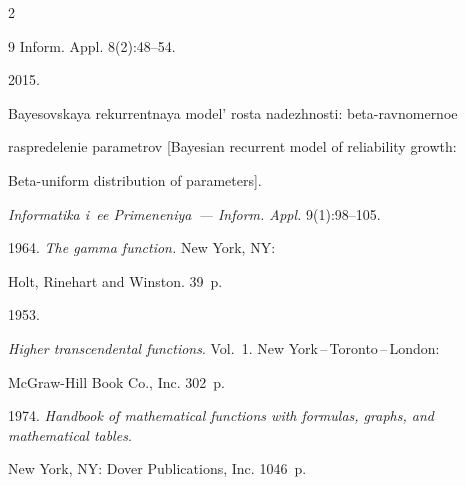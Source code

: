 \begin{multicols}{2}
{{\begin{thebibliography}{9}
{Inform. Appl.} 8(2):48--54.







 2015.


Bayesovskaya rekurrentnaya mo\-del' ros\-ta na\-dezh\-nosti: beta-ravnomernoe


raspredelenie pa\-ra\-met\-rov [Bayesian recurrent model of reliability growth: 


Beta-uniform distribution of parameters].


\textit{Informatika i~ee Primeneniya~--- Inform. Appl.} 9(1):98--105.







 1964. \textit{The gamma function.} New York, NY: 


Holt, Rinehart and Winston. 39~p. 







 1953. 


\textit{Higher transcendental functions}. Vol.~1. New York\,--\,Toronto\,--\,London: 


McGraw-Hill Book Co., Inc. 302~p.









1974. \textit{Handbook of mathematical functions with formulas, graphs, and mathematical tables}. 


New York, NY: Dover Publications, Inc. 1046~p.


\end{thebibliography}





 }


 }





\end{multicols}





\vspace*{-6pt}





